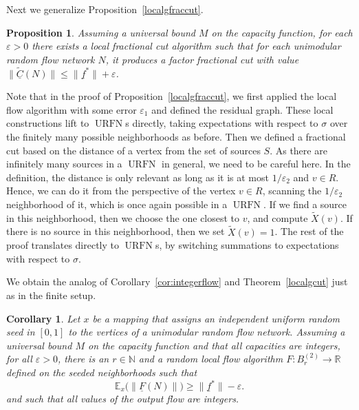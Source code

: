 \documentclass[12pt,a4paper]{article}
\newtheorem{Corollary}[Theorem]{Corollary}
\newtheorem{Proposition}[Theorem]{Proposition}
\newcommand{\eps}{\varepsilon}
\newcommand{\E}{\mathbb{E}}
\newcommand{\N}{\mathbb{N}}
\renewcommand{\:}{\colon}
\DeclareMathOperator{\URN}{URFN}
\begin{document}
Next we generalize Proposition~\ref{localgfraccut}. 

\begin{Proposition}\label{localgfraccutuni}
Assuming a universal bound $M$ on the capacity function, for each $\eps > 0$ there exists a local fractional cut algorithm such that for each unimodular random flow network $N$, it produces a factor fractional cut with value $\big\|\underline{\tilde{C}}(N)\big\| \le \|\underline{f}^*\| + \eps$.
\end{Proposition}

Note that in the proof of Proposition~\ref{localgfraccut}, we first applied the local flow algorithm with some error $\eps_1$ and defined the residual graph. 
These local constructions lift to $\URN$s directly, taking expectations with respect to $\sigma$ over the finitely many possible neighborhoods as before. 
Then we defined a fractional cut based on the distance of a vertex from the set of sources $S$. 
As there are infinitely many sources in a $\URN$ in general, we need to be careful here. 
In the definition, the distance is only relevant as long as it is at most $1/\eps_2$ and $v\in R$. 
Hence, we can do it from the perspective of the vertex $v\in R$, scanning the $1/\eps_2$ neighborhood of it, which is once again possible in a $\URN$. 
If we find a source in this neighborhood, then we choose the one closest to $v$, and compute $\tilde{X}(v)$. 
If there is no source in this neighborhood, then we set $\tilde{X}(v)=1$. 
The rest of the proof translates directly to $\URN$s, by switching summations to expectations with respect to $\sigma$. 

We obtain the analog of Corollary~\ref{cor:integerflow} and Theorem~\ref{localgcut} just as in the finite setup. 

\begin{Corollary}\label{cor:integerflowURN}
Let $x$ be a mapping that assigns an independent uniform random seed in $[0,1]$ to the vertices of a unimodular random flow network. 
Assuming a universal bound $M$ on the capacity function and that all capacities are integers, for all $\eps > 0$, there is an $r\in \N$ and a random local flow algorithm $F\: B_r^{(2)} \rightarrow \mathbb{R}$ defined on the seeded neighborhoods such that 
\begin{equation} \label{Thm1eqbounded}
\E_x\big(\big\|\underline{F}(N)\big\|\big) \ge \|\underline{f}^*\| - \eps.
\end{equation}
and such that all values of the output flow are integers. 
\end{Corollary}
\end{document}
